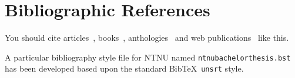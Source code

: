 \section{Bibliographic References}

You should cite articles~\cite{Askvall1985}, books~\cite{Card1983},
anthologies~\cite{Lancaster1985} and web publications~\cite{Meldon1997}
like this.


A particular bibliography style file for NTNU named
\texttt{ntnubachelorthesis.bst} has been developed based upon the
standard Bib\TeX\ \texttt{unsrt} style.
